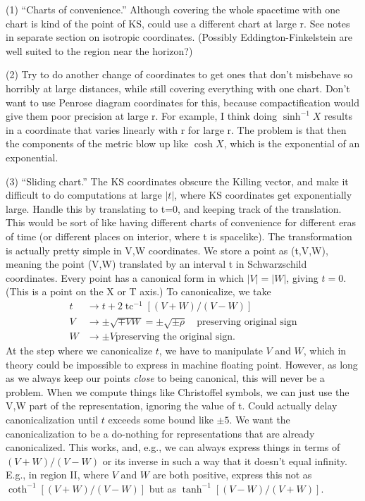 \documentclass{article}
\begin{document}
(1) ``Charts of convenience.'' Although covering the whole spacetime with one chart is kind of the point of KS,
could use a different chart at large r. See notes in separate section on isotropic coordinates.
(Possibly
Eddington-Finkelstein are well suited to the region near the horizon?)

(2) Try to do another change of coordinates to get ones that don't misbehave so horribly at
large distances, while still covering everything with one chart. Don't want to use Penrose diagram
coordinates for this, because compactification would give them poor precision at large r. For example,
I think doing $\sinh^{-1}X$ results in a coordinate that varies linearly with r for large r. The problem
is that then the components of the metric blow up like $\cosh X$, which is the exponential of an
exponential.

(3) ``Sliding chart.'' The KS coordinates obscure the Killing vector, and make it difficult
to do computations at large $|t|$, where KS coordinates get exponentially large.
Handle this by translating to t=0, and keeping track of the translation. This would be sort of like
having different charts of convenience for different eras of time (or different places on interior,
where t is spacelike). The transformation is actually pretty
simple in V,W coordinates. We store a point 
as (t,V,W), meaning the point (V,W) translated by an interval t in Schwarzschild coordinates.
Every point has a canonical form in which $|V|=|W|$, giving $t=0$. (This is a point on the X
or T axis.) To canonicalize, we take
\begin{align*}
  t &\rightarrow t+2\operatorname{tc}^{-1}[(V+W)/(V-W)] \\
  V &\rightarrow \pm\sqrt{\mp VW} = \pm\sqrt{\pm\rho} \quad \text{preserving original sign} \\
  W &\rightarrow \pm V \text{preserving the original sign}.
\end{align*}
At the step where we  canonicalize $t$, we have to manipulate $V$ and $W$, which in theory could
be impossible to express in machine floating point. However, as long as we always keep our points
\emph{close} to being canonical, this will never be a problem. When we compute things like Christoffel
symbols, we can just use the V,W part of the representation, ignoring the value of t. Could actually
delay canonicalization until $t$ exceeds some bound like $\pm5$. We want the canonicalization to be
a do-nothing for representations that are already canonicalized. This works, and, e.g., we can
always express things in terms of $(V+W)/(V-W)$ or its inverse in such a way that it doesn't equal
infinity. E.g., in region II, where $V$ and $W$ are both positive,
express this not as $\coth^{-1}[(V+W)/(V-W)]$ but as
$\tanh^{-1}[(V-W)/(V+W)]$.
\end{document}
